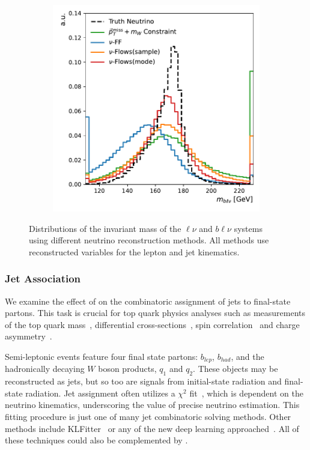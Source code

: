 \begin{figure}[htp]
\begin{subfigure}{0.40\textwidth}
        \includegraphics[width=\textwidth]{Figures/neutrino_unfolding/blnu_mass.pdf}
        \caption{} \label{fig:blv_mass}
    \end{subfigure}
    \caption{Distributions of the invariant mass of the $\ell\nu$  and $b\ell\nu$  systems using different neutrino reconstruction methods. All methods use reconstructed variables for the lepton and jet kinematics.}
    \label{fig:real_assoc_masses}
\end{figure}

\subsubsection{Jet Association}

We examine the effect of \vflows on the combinatoric assignment of jets to final-state partons.
This task is crucial for top quark physics analyses such as measurements of the top quark mass~\cite{ATLAS:2015pfy,CMS:2018quc,ATLAS:2018fwq,ATLAS:2019guf}, differential cross-sections~\cite{CMS:2016oae,CMS:2018htd,Quad4,CMS:2021vhb}, spin correlation~\cite{CMS:2015cal} and charge asymmetry~\cite{ATLAS:2022waa}.

Semi-leptonic \ttbar events feature four final state partons: $b_{lep}$, $b_{had}$, and the hadronically decaying $W$ boson products, $q_1$ and $q_2$.
These objects may be reconstructed as jets, but so too are signals from initial-state radiation and final-state radiation.
Jet assignment often utilizes a $\chi^2$ fit~\cite{Chi2ATLAS}, which is dependent on the neutrino kinematics, underscoring the value of precise neutrino estimation.
This fitting procedure is just one of many jet combinatoric solving methods.
Other methods include KLFitter~\cite{KLFitter} or any of the new deep learning approached~\cite{SAJA, SPANet, Spatter, TopoGraphs}.
All of these techniques could also be complemented by \vflows.

